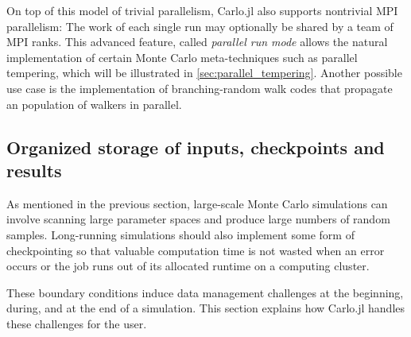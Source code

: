 \documentclass{SciPost}
\begin{document}
On top of this model of trivial parallelism, Carlo.jl also supports nontrivial MPI parallelism: The work of each single run may optionally be shared by a team of MPI ranks. This advanced feature, called \textit{parallel run mode} allows the natural implementation of certain Monte Carlo meta-techniques such as parallel tempering, which will be illustrated in \cref{sec:parallel_tempering}. Another possible use case is the implementation of branching-random walk codes that propagate an population of walkers in parallel.
\subsection{Organized storage of inputs, checkpoints and results}
As mentioned in the previous section, large-scale Monte Carlo simulations can involve scanning large parameter spaces and produce large numbers of random samples. Long-running simulations should also implement some form of checkpointing so that valuable computation time is not wasted when an error occurs or the job runs out of its allocated runtime on a computing cluster. 

These boundary conditions induce data management challenges at the beginning, during, and at the end of a simulation. This section explains how Carlo.jl handles these challenges for the user.
\end{document}
